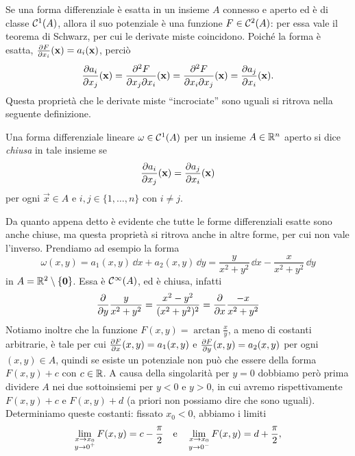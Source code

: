 Se una forma differenziale è esatta in un insieme $A$ connesso e aperto ed è di classe $\mathcal{C}^{{1}}(A)$, allora il suo potenziale è una funzione $F\in\mathcal{C}^{{2}}(A)$: per essa vale il teorema di Schwarz, per cui le derivate miste coincidono.
Poiché la forma è esatta, $\frac{\partial {F}}{\partial {x_i}}(\mathbf{x})=a_i(\mathbf{x})$, perciò
\begin{equation}
	\frac{\partial {a_i}}{\partial {x_j}}(\mathbf{x})=\frac{\partial^2 F}{\partial x_j\partial x_i}(\mathbf{x})=\frac{\partial^2 F}{\partial x_i\partial x_j}(\mathbf{x})=\frac{\partial {a_j}}{\partial {x_i}}(\mathbf{x}).
\end{equation}
Questa proprietà che le derivate miste ``incrociate'' sono uguali si ritrova nella seguente definizione.
\begin{definizione} \label{d:forma-diff-chiusa}
	Una forma differenziale lineare $\omega\in\mathcal{C}^{{1}}(A)$ per un insieme $A\in\mathbb{R}^n$ aperto si dice \emph{chiusa} in tale insieme se
	\begin{equation}
		\frac{\partial {a_i}}{\partial {x_j}}(\mathbf{x})=\frac{\partial {a_j}}{\partial {x_i}}(\mathbf{x})
	\end{equation}
	per ogni $\vec x\in A$ e $i,j\in\{1,\dots,n\}$ con $i\neq j$.
\end{definizione}
Da quanto appena detto è evidente che tutte le forme differenziali esatte sono anche chiuse, ma questa proprietà si ritrova anche in altre forme, per cui non vale l'inverso.
Prendiamo ad esempio la forma
\begin{equation*}
	\omega(x,y)=a_1(x,y)\,\dd x+a_2(x,y)\,\dd y=\frac{y}{x^2+y^2}\,\dd x-\frac{x}{x^2+y^2}\,\dd y
\end{equation*}
in $A=\mathbb{R}^2\setminus\{\mathbf{0}\}$.
Essa è $\mathcal{C}^{{\infty}}(A)$, ed è chiusa, infatti
\begin{equation}
	\frac{\partial {}}{\partial {y}}\frac{y}{x^2+y^2}=\frac{x^2-y^2}{(x^2+y^2)^2}=\frac{\partial {}}{\partial {x}}\frac{-x}{x^2+y^2}
\end{equation}
Notiamo inoltre che la funzione $F(x,y)=\arctan\frac{x}{y}$, a meno di costanti arbitrarie, è tale per cui $\frac{\partial {F}}{\partial {x}}(x,y)=a_1(x,y)$ e $\frac{\partial {F}}{\partial {y}}(x,y)=a_2(x,y)$ per ogni $(x,y)\in A$, quindi se esiste un potenziale non può che essere della forma $F(x,y)+c$ con $c\in\mathbb{R}$.
A causa della singolarità per $y=0$ dobbiamo però prima dividere $A$ nei due sottoinsiemi per $y<0$ e $y>0$, in cui avremo rispettivamente $F(x,y)+c$ e $F(x,y)+d$ (a priori non possiamo dire che sono uguali).
Determiniamo queste costanti: fissato $x_0<0$, abbiamo i limiti
\begin{equation}
	\lim_{\substack{x\to x_0\\ y\to 0^+}}F(x,y)=c-\frac{\pi}2\quad\text{e}\quad\lim_{\substack{x\to x_0\\ y\to 0^-}}F(x,y)=d+\frac{\pi}2,
\end{equation}
